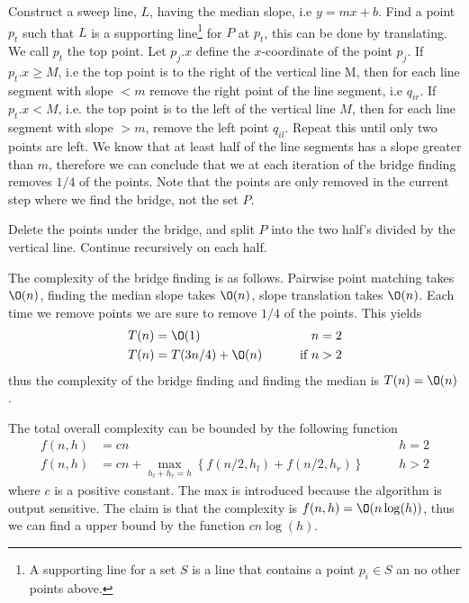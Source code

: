 \documentclass[10pt]{article}
\begin{document}
Construct a sweep line, $L$, having the median slope, i.e $y = mx+b$. Find a point $p_t$ such that $L$ is a supporting line\footnote{A supporting line for a set $S$ is a line that contains a point $p_i \in S$ an no other points above.} for $P$ at $p_t$, this can be done by translating. We call $p_t$ the top point. Let $p_j.x$ define the $x$-coordinate of the point $p_j$. If $p_t.x \geq M$, i.e the top point is to the right of the vertical line M, then for each line segment with slope $< m$ remove the right point of the line segment, i.e $q_{ir}$. If $p_t.x < M$, i.e. the top point is to the left of the vertical line $M$, then for each line segment with slope $>m$, remove the left point $q_{il}$. Repeat this until only two points are left. We know that at least half of the line segments has a slope greater than $m$, therefore we can conclude that we at each iteration of the bridge finding removes $1/4$ of the points. Note that the points are only removed in the current step where we find the bridge, not the set $P$.

Delete the points under the bridge, and split $P$ into the two half's divided by the vertical line. Continue recursively on each half.

The complexity of the bridge finding is as follows. Pairwise point matching takes $\O(n)$, finding the median slope takes $\O(n)$, slope translation takes $\O(n)$. Each time we remove points we are sure to remove $1/4$ of the points. This yields 
\begin{align*}
T(n) &= \O(1) &\qquad n=2\\ 
T(n) &= T(3n/4) + \O(n) &\qquad \text{if } n>2
\end{align*}
thus the complexity of the bridge finding and finding the median is $T(n)=\O(n)$.

The total overall complexity can be bounded by the following function
\begin{align*}
f(n,h) &= cn &\qquad h=2  \\ 
f(n,h) &= cn + \max_{h_l+h_r = h}\left\{f(n/2,h_l)+f(n/2,h_r)\right\} &\qquad h>2
\end{align*}
where $c$ is a positive constant. The max is introduced because the algorithm is output sensitive. The claim is that the complexity is $f(n,h) = \O(n\log(h))$, thus we can find a upper bound by the function $cn\log(h)$.
\end{document}
